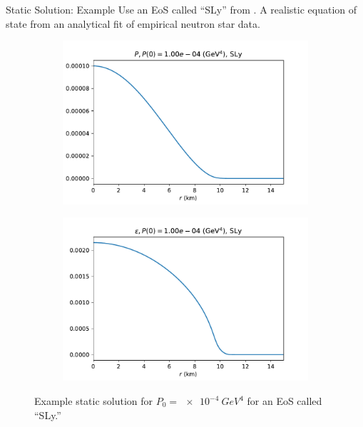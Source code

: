 \documentclass[]{beamer}
\begin{document}
    \begin{frame}{Static Solution: Example}
        \pause
        Use an EoS called ``SLy'' from \autocite{SLy_2004}. A realistic equation of state from an analytical fit of empirical neutron star data. \pause

        \begin{figure}[h!]
            \centering
            \begin{subfigure}{.5\textwidth}
                \includegraphics[width = \textwidth]{SLy_P,p0_0.0001.pdf}
            \end{subfigure}%
            \begin{subfigure}{.5\textwidth}
                \includegraphics[width = \textwidth]{SLy_rho,p0_0.0001.pdf}
            \end{subfigure}
            \caption[]{Example static solution for $P_0 = \SI{e-4}{GeV^4}$ for an EoS called ``SLy.''}
        \end{figure}

    \end{frame}
\end{document}
